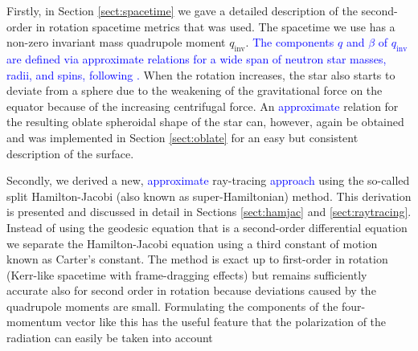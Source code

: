 \documentclass{aa}
\newcommand{\refe}[1]{\textcolor{blue}{{#1}}}
\newcommand{\qinv}{\ensuremath{q_{\mathrm{inv}}}}
\begin{document}
Firstly, in Section \ref{sect:spacetime} we gave a detailed description of the second-order in rotation spacetime metrics that was used.
The spacetime we use has a non-zero invariant mass quadrupole moment $\qinv$. 
\refe{The components $q$ and $\beta$ of $\qinv$ are defined via approximate relations for a wide span of neutron star masses, radii, and spins, following \citet{aGM14}.}
When the rotation increases, the star also starts to deviate from a sphere due to the weakening of the gravitational force on the equator because of the increasing centrifugal force.
An \refe{approximate} relation for the resulting oblate spheroidal shape of the star can, however, again be obtained \citep{MLC07, aGM14} and was implemented in Section \ref{sect:oblate} for an easy but consistent description of the surface.

Secondly, we derived a new, \refe{approximate} ray-tracing \refe{approach} using the so-called split Hamilton-Jacobi (also known as super-Hamiltonian) method.
This derivation is presented and discussed in detail in Sections \ref{sect:hamjac} and \ref{sect:raytracing}.
Instead of using the geodesic equation that is a second-order differential equation we separate the Hamilton-Jacobi equation using a third constant of motion known as Carter's constant.
The method is exact up to first-order in rotation (Kerr-like spacetime with frame-dragging effects) but remains sufficiently accurate also for second order in rotation because deviations caused by the quadrupole moments are small.
Formulating the components of the four-momentum vector like this has the useful feature that the polarization of the radiation can easily be taken into account \citep[see e.g.][]{cha, dexter2016}
\end{document}
